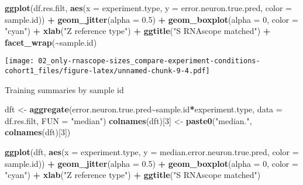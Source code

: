 \documentclass[
]{article}
\newenvironment{Shaded}{\begin{snugshade}}{\end{snugshade}}
\newcommand{\AttributeTok}[1]{\textcolor[rgb]{0.13,0.29,0.53}{#1}}
\newcommand{\DecValTok}[1]{\textcolor[rgb]{0.00,0.00,0.81}{#1}}
\newcommand{\FloatTok}[1]{\textcolor[rgb]{0.00,0.00,0.81}{#1}}
\newcommand{\FunctionTok}[1]{\textcolor[rgb]{0.13,0.29,0.53}{\textbf{#1}}}
\newcommand{\NormalTok}[1]{#1}
\newcommand{\OtherTok}[1]{\textcolor[rgb]{0.56,0.35,0.01}{#1}}
\newcommand{\SpecialCharTok}[1]{\textcolor[rgb]{0.81,0.36,0.00}{\textbf{#1}}}
\newcommand{\StringTok}[1]{\textcolor[rgb]{0.31,0.60,0.02}{#1}}
\begin{document}
\begin{Shaded}
\begin{Highlighting}[]
\FunctionTok{ggplot}\NormalTok{(df.res.filt, }\FunctionTok{aes}\NormalTok{(}\AttributeTok{x =}\NormalTok{ experiment.type, }
                        \AttributeTok{y =}\NormalTok{ error.neuron.true.pred, }\AttributeTok{color =}\NormalTok{ sample.id)) }\SpecialCharTok{+} \FunctionTok{geom\_jitter}\NormalTok{(}\AttributeTok{alpha =} \FloatTok{0.5}\NormalTok{) }\SpecialCharTok{+} 
  \FunctionTok{geom\_boxplot}\NormalTok{(}\AttributeTok{alpha =} \DecValTok{0}\NormalTok{, }\AttributeTok{color =} \StringTok{"cyan"}\NormalTok{) }\SpecialCharTok{+} \FunctionTok{xlab}\NormalTok{(}\StringTok{"Z reference type"}\NormalTok{) }\SpecialCharTok{+}
  \FunctionTok{ggtitle}\NormalTok{(}\StringTok{"S RNAscope matched"}\NormalTok{) }\SpecialCharTok{+} \FunctionTok{facet\_wrap}\NormalTok{(}\SpecialCharTok{\textasciitilde{}}\NormalTok{sample.id)}
\end{Highlighting}
\end{Shaded}

\texttt{[image: 02\_only-rnascope-sizes\_compare-experiment-conditions-cohort1\_files/figure-latex/unnamed-chunk-9-4.pdf]}

Training summaries by sample id

\begin{Shaded}
\begin{Highlighting}[]
\NormalTok{dft }\OtherTok{\textless{}{-}} \FunctionTok{aggregate}\NormalTok{(error.neuron.true.pred}\SpecialCharTok{\textasciitilde{}}\NormalTok{sample.id}\SpecialCharTok{*}\NormalTok{experiment.type, }\AttributeTok{data =}\NormalTok{ df.res.filt, }\AttributeTok{FUN =} \StringTok{"median"}\NormalTok{)}
\FunctionTok{colnames}\NormalTok{(dft)[}\DecValTok{3}\NormalTok{] }\OtherTok{\textless{}{-}} \FunctionTok{paste0}\NormalTok{(}\StringTok{"median."}\NormalTok{, }\FunctionTok{colnames}\NormalTok{(dft)[}\DecValTok{3}\NormalTok{])}

\FunctionTok{ggplot}\NormalTok{(dft, }\FunctionTok{aes}\NormalTok{(}\AttributeTok{x =}\NormalTok{ experiment.type, }
                \AttributeTok{y =}\NormalTok{ median.error.neuron.true.pred, }\AttributeTok{color =}\NormalTok{ sample.id)) }\SpecialCharTok{+} \FunctionTok{geom\_jitter}\NormalTok{(}\AttributeTok{alpha =} \FloatTok{0.5}\NormalTok{) }\SpecialCharTok{+} 
  \FunctionTok{geom\_boxplot}\NormalTok{(}\AttributeTok{alpha =} \DecValTok{0}\NormalTok{, }\AttributeTok{color =} \StringTok{"cyan"}\NormalTok{) }\SpecialCharTok{+} \FunctionTok{xlab}\NormalTok{(}\StringTok{"Z reference type"}\NormalTok{) }\SpecialCharTok{+} \FunctionTok{ggtitle}\NormalTok{(}\StringTok{"S RNAscope matched"}\NormalTok{)}
\end{Highlighting}
\end{Shaded}
\end{document}
